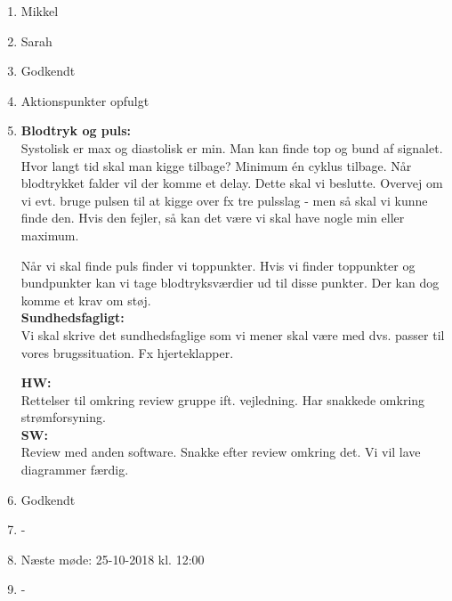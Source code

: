 \begin{enumerate}
	\item Mikkel
	\item Sarah
	\item Godkendt
	\item Aktionspunkter opfulgt
	\item \textbf{Blodtryk og puls:} \\
	Systolisk er max og diastolisk er min. Man kan finde top og bund af signalet. 
	Hvor langt tid skal man kigge tilbage? Minimum én cyklus tilbage. Når blodtrykket falder vil der komme et delay. Dette skal vi beslutte. Overvej om vi evt. bruge pulsen til at kigge over fx tre pulsslag - men så skal vi kunne finde den. Hvis den fejler, så kan det være vi skal have nogle min eller maximum. 
	
	Når vi skal finde puls finder vi toppunkter. Hvis vi finder toppunkter og bundpunkter kan vi tage blodtryksværdier ud til disse punkter. Der kan dog komme et krav om støj. \\
	
	\textbf{Sundhedsfagligt:} \\
	Vi skal skrive det sundhedsfaglige som vi mener skal være med dvs. passer til vores brugssituation. Fx hjerteklapper.
	
	\textbf{HW:} \\
	Rettelser til omkring review gruppe ift. vejledning. Har snakkede omkring strømforsyning. \\
	
	\textbf{SW:} \\
	Review med anden software. Snakke efter review omkring det. Vi vil lave diagrammer færdig. \\
	
	\item Godkendt \\
	\item - \\
	\item Næste møde: 25-10-2018 kl. 12:00 \\ 
	\item -
	
\end{enumerate}

\clearpage
